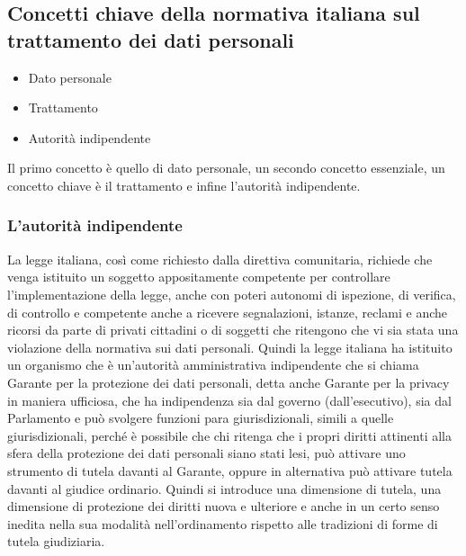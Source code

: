 \subsection{Concetti chiave della normativa italiana sul trattamento dei dati personali}

\begin{itemize}
    \item Dato personale
    \item Trattamento
    \item Autorità indipendente
\end{itemize}

Il primo concetto è quello di dato personale, un secondo concetto essenziale, un concetto chiave è il trattamento e infine l'autorità indipendente. 

\subsubsection{L'autorità indipendente}

La legge italiana, così come richiesto dalla direttiva comunitaria, richiede che venga istituito un soggetto appositamente competente  per controllare l'implementazione della legge, anche con poteri autonomi di ispezione, di verifica, di controllo e competente anche a ricevere segnalazioni, istanze, reclami e anche ricorsi da parte di privati cittadini o di soggetti che ritengono che vi sia stata una violazione della normativa sui dati personali. 
Quindi la legge italiana ha istituito un organismo che è un'autorità amministrativa indipendente che si chiama Garante per la protezione dei dati personali, detta anche Garante per la privacy in maniera ufficiosa, che ha indipendenza sia dal governo (dall'esecutivo), sia dal Parlamento e può svolgere funzioni para giurisdizionali, simili a quelle giurisdizionali, perché è possibile che chi ritenga che i propri diritti attinenti alla sfera della protezione dei dati personali siano stati lesi, può attivare uno strumento di tutela davanti al Garante, oppure in alternativa può attivare tutela davanti al giudice ordinario. 
Quindi si introduce una dimensione di tutela, una dimensione di protezione dei diritti nuova e ulteriore e anche in un certo senso inedita nella sua modalità nell'ordinamento rispetto alle tradizioni di forme di tutela giudiziaria. 

